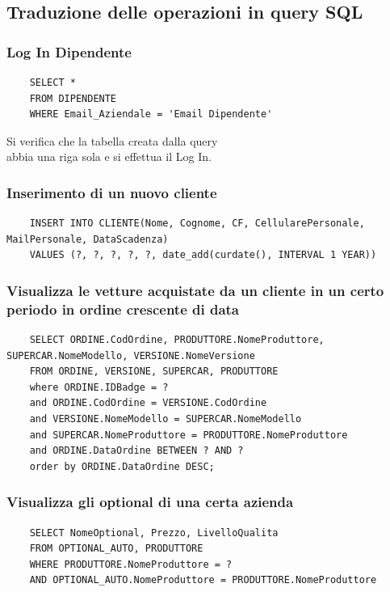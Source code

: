 \documentclass[11pt]{article}
\begin{document}
\newpage

\lstset{style=sqlStyle}

\subsection{Traduzione delle operazioni in query SQL}

\subsubsection*{Log In Dipendente}

\begin{lstlisting}
    SELECT * 
    FROM DIPENDENTE 
    WHERE Email_Aziendale = 'Email Dipendente'
\end{lstlisting}
Si verifica che la tabella creata dalla query \\
abbia una riga sola e si effettua il Log In.

\subsubsection*{Inserimento di un nuovo cliente}

\begin{lstlisting}
    INSERT INTO CLIENTE(Nome, Cognome, CF, CellularePersonale, MailPersonale, DataScadenza)
    VALUES (?, ?, ?, ?, ?, date_add(curdate(), INTERVAL 1 YEAR))
\end{lstlisting}

\subsubsection*{Visualizza le vetture acquistate da un cliente in un certo
periodo in ordine crescente di data}

\begin{lstlisting}
    SELECT ORDINE.CodOrdine, PRODUTTORE.NomeProduttore, SUPERCAR.NomeModello, VERSIONE.NomeVersione
    FROM ORDINE, VERSIONE, SUPERCAR, PRODUTTORE
    where ORDINE.IDBadge = ?
    and ORDINE.CodOrdine = VERSIONE.CodOrdine
    and VERSIONE.NomeModello = SUPERCAR.NomeModello
    and SUPERCAR.NomeProduttore = PRODUTTORE.NomeProduttore
    and ORDINE.DataOrdine BETWEEN ? AND ?
    order by ORDINE.DataOrdine DESC;
\end{lstlisting}

\subsubsection*{Visualizza gli optional di una certa azienda}
\begin{lstlisting}
    SELECT NomeOptional, Prezzo, LivelloQualita
    FROM OPTIONAL_AUTO, PRODUTTORE
    WHERE PRODUTTORE.NomeProduttore = ?
    AND OPTIONAL_AUTO.NomeProduttore = PRODUTTORE.NomeProduttore
\end{lstlisting}
\end{document}
